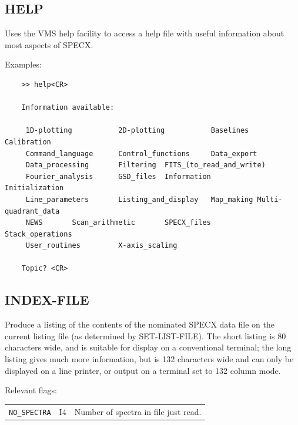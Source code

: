 \documentclass[11pt,twoside]{report}
\begin{document}
\subsection{HELP} 

Uses the VMS help facility to access a help file with useful information
about most aspects of SPECX.

Examples:
\begin{verbatim}
    >> help<CR>

    Information available:

     1D-plotting           2D-plotting           Baselines  Calibration
     Command_language      Control_functions     Data_export
     Data_processing       Filtering  FITS_(to_read_and_write)
     Fourier_analysis      GSD_files  Information           Initialization
     Line_parameters       Listing_and_display   Map_making Multi-quadrant_data
     NEWS       Scan_arithmetic       SPECX_files           Stack_operations
     User_routines         X-axis_scaling

    Topic? <CR>

\end{verbatim}

\subsection{INDEX-FILE} 

Produce a listing of the contents of the nominated SPECX data file on the
current listing file (as determined by SET-LIST-FILE). The short listing is 80
characters wide, and is suitable for display on a conventional terminal; the
long listing gives much more information, but is 132 characters wide and can
only be displayed on a line printer, or output on a terminal set to 132 column
mode. 

Relevant flags:\\
\begin{tabular}{lll}
  \verb+NO_SPECTRA+ & I4 & Number of spectra in file just read.
\end{tabular}
\end{document}
